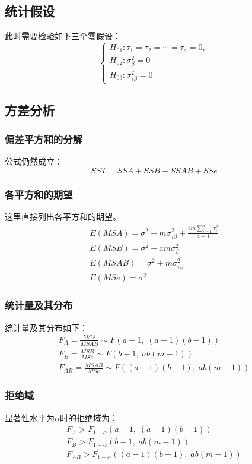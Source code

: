 \subsection{统计假设}
此时需要检验如下三个零假设：
\begin{equation*}
	\begin{cases}
		H_{01}:\tau_1=\tau_2=\cdots=\tau_a=0, \\
		H_{02}:\sigma_\beta^2=0 \\
		H_{03}:\sigma_{\tau\beta}^2=0
	\end{cases}
\end{equation*}

\subsection{方差分析}
\subsubsection{偏差平方和的分解}
公式仍然成立：
\begin{equation*}
	SST=SSA+SSB+SSAB+SSe
\end{equation*}
\subsubsection{各平方和的期望}
这里直接列出各平方和的期望。
\begin{gather*}
	E(MSA)=\sigma^2+m\sigma_{\tau\beta}^2+\frac{bm\sum\limits_{i=1}^a\tau_i^2}{a-1} \\
	E(MSB)=\sigma^2+am\sigma_\beta^2 \\
	E(MSAB)=\sigma^2+m\sigma_{\tau\beta}^2 \\
	E(MSe)=\sigma^2
\end{gather*}
\subsubsection{统计量及其分布}
统计量及其分布如下：
\begin{gather*}
	F_A=\frac{MSA}{MSAB}\sim F(a-1,\;(a-1)(b-1)) \\
	F_B=\frac{MSB}{MSe}\sim F(b-1,\;ab(m-1)) \\
	F_{AB}=\frac{MSAB}{MSe}\sim F((a-1)(b-1),\;ab(m-1))
\end{gather*}
\subsubsection{拒绝域}
显著性水平为$\alpha$时的拒绝域为：
\begin{gather*}
	F_A>F_{1-\alpha}(a-1,\;(a-1)(b-1)) \\
	F_B>F_{1-\alpha}(b-1,\;ab(m-1)) \\
	F_{AB}>F_{1-\alpha}((a-1)(b-1),\;ab(m-1))
\end{gather*}
